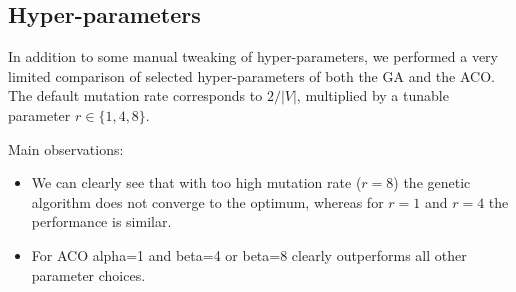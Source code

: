 \documentclass[12pt]{article}
\begin{document}
\subsection{Hyper-parameters}
In addition to some manual tweaking of hyper-parameters, we performed a very limited comparison of selected hyper-parameters of both the GA and the ACO. 
The default mutation rate corresponds to $2/|V|$, multiplied by a tunable parameter $r \in \{1,4,8\}$. 

Main observations:
\begin{itemize}
	\item We can clearly see that with too high mutation rate ($r=8$) the genetic algorithm does not converge to the optimum, whereas for $r=1$ and $r=4$ the performance is similar.
	\item For ACO alpha=1 and beta=4 or beta=8 clearly outperforms all other parameter choices.
\end{itemize}
\end{document}
